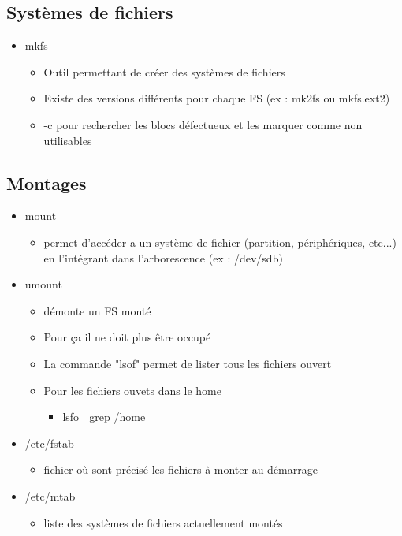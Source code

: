 \documentclass[a4paper]{article}
\begin{document}
      \subsection{Systèmes de fichiers}
      \begin{itemize}[label=\textbullet, font=\Large]
        \item mkfs
        \begin{itemize}[label=, font=\scriptsize]
          \item Outil permettant de créer des systèmes de fichiers
          \item Existe des versions différents pour chaque FS (ex : mk2fs ou mkfs.ext2)
          \item -c pour rechercher les blocs défectueux et les marquer comme non utilisables
        \end{itemize}
      \end{itemize}

      \subsection{Montages}
      \begin{itemize}[label=\textbullet, font=\Large]
        \item mount
        \begin{itemize}[label=, font=\scriptsize]
          \item permet d'accéder a un système de fichier (partition, périphériques, etc...) en l'intégrant dans l'arborescence (ex : /dev/sdb)
        \end{itemize}
        \item umount
        \begin{itemize}[label=, font=\scriptsize]
          \item démonte un FS monté
          \item Pour ça il ne doit plus être occupé
          \item La commande "lsof" permet de lister tous les fichiers ouvert
          \item Pour les fichiers ouvets dans le home
          \begin{itemize}
            \item lsfo | grep /home
          \end{itemize}
        \end{itemize}
        \item /etc/fstab
        \begin{itemize}[label=, font=\scriptsize]   
          \item fichier où sont précisé les fichiers à monter au démarrage
        \end{itemize}
        \item /etc/mtab
        \begin{itemize}[label=, font=\scriptsize]   
          \item liste des systèmes de fichiers actuellement montés
        \end{itemize}
      \end{itemize}
\end{document}
